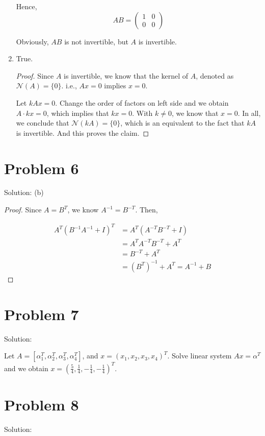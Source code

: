\documentclass[12pt]{article}
\begin{document}
\begin{enumerate}
Hence, $$AB = \begin{pmatrix}
1 & 0 \\
0 & 0
\end{pmatrix}
$$

Obviously, $AB$ is not invertible, but $A$ is invertible.



\item True.

\begin{proof}
Since $A$ is invertible, we know that the kernel of $A$, denoted as $\mathcal N(A) = \{0\}$. i.e., $Ax = 0$ implies $x = 0$. 

Let $kAx = 0$. Change the order of factors on left side and we obtain $A\cdot kx = 0$, which implies that $kx = 0$. With $k\neq 0$, we know that $x = 0$. In all, we conclude that $\mathcal N(kA) = \{0\}$, which is an equivalent to the fact that $kA$ is invertible. And this proves the claim.

\end{proof}
\end{enumerate}


\section{Problem 6}
Solution: (b)

\begin{proof}
Since $A = B^T$, we know $A^{-1} = B^{-T}$. Then, 

$$
\begin{aligned}
A^T(B^{-1}A^{-1} + I)^T 
& = A^T(A^{-T}B^{-T} + I) \\
& = A^TA^{-T}B^{-T} + A^T \\
& = B^{-T} + A^T \\
& = (B^T)^{-1} + A^T = A^{-1} + B
\end{aligned}
$$

\end{proof}


\section{Problem 7}
Solution: 

Let $A = [\alpha_1^T, \alpha_2^T, \alpha_3^T, \alpha_4^T]$, and $x = (x_1, x_2, x_3, x_4)^T$. Solve linear system $Ax = \alpha^T$ and we obtain $x = (\frac{5}{4}, \frac{1}{4}, -\frac{1}{4}, -\frac{1}{4})^T$.

\section{Problem 8}
Solution: 
\end{document}
